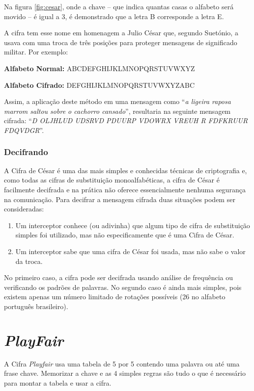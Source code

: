 \documentclass[
article,			%
11pt,				%
oneside,			%
a4paper,			%
english,			%
brazil,				%
sumario=tradicional
]{abntex2}
\begin{document}
			Na figura \ref{fig:cesar}, onde a chave – que indica quantas casas o alfabeto será movido – é igual a 3,  é demonstrado que a letra B corresponde a letra E.
			
			A cifra tem esse nome em homenagem a Julio César que, segundo Suetónio, a usava com uma troca de três posições para proteger mensagens de significado militar. Por exemplo:
			
			\textbf{Alfabeto Normal:}  ABCDEFGHIJKLMNOPQRSTUVWXYZ
			
			\textbf{Alfabeto Cifrado:}  DEFGHIJKLMNOPQRSTUVWXYZABC
			
			Assim, a aplicação deste método em uma mensagem como ``\textit{a ligeira raposa marrom saltou sobre o cachorro cansado}'', resultaria na seguinte mensagem cifrada: ``\textit{D OLJHLUD UDSRVD PDUURP VDOWRX VREUH R FDFKRUUR FDQVDGR}''.
			
			\subsubsection*{Decifrando}
				A Cifra de César é uma das mais simples e conhecidas técnicas de criptografia e, como todas as cifras de substituição monoalfabéticas, a cifra de César é facilmente decifrada e na prática não oferece essencialmente nenhuma segurança na comunicação. Para decifrar a mensagem cifrada duas situações podem ser consideradas:
				\begin{enumerate}
					\item Um interceptor conhece (ou adivinha) que algum tipo de cifra de substituição simples foi utilizado, mas não especificamente que é uma Cifra de César.
					\item Um interceptor sabe que uma cifra de César foi usada, mas não sabe o valor da troca.
				\end{enumerate}

				No primeiro caso, a cifra pode ser decifrada usando análise de frequência ou verificando os padrões de palavras. No segundo caso é ainda mais simples, pois existem apenas um número limitado de rotações possíveis (26 no alfabeto português brasileiro).
	
	\section{\textit{PlayFair}}
		A Cifra \textit{Playfair} usa uma tabela de 5 por 5 contendo uma palavra ou até uma frase chave. Memorizar a chave e as 4 simples regras são tudo o que é necessário para montar a tabela e usar a cifra.
		
\end{document}
